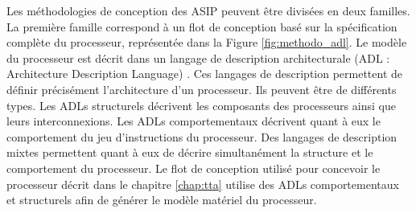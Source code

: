 Les méthodologies de conception des ASIP peuvent être divisées en deux familles. La première famille correspond à un flot de conception basé sur la spécification complète du processeur, représentée dans la Figure \ref{fig:methodo_adl}. Le modèle du processeur est décrit dans un langage de description architecturale (ADL : Architecture Description Language) \cite{mishra2011processor}. Ces langages de description permettent de définir précisément l'architecture d'un processeur. Ils peuvent être de différents types. Les ADLs structurels décrivent les composants des processeurs ainsi que leurs interconnexions. Les ADLs comportementaux décrivent quant à eux le comportement du jeu d'instructions du processeur. Des langages de description mixtes permettent quant à eux de décrire simultanément la structure et le comportement du processeur. Le flot de conception utilisé pour concevoir le processeur décrit dans le chapitre \ref{chap:tta} utilise des ADLs comportementaux et structurels afin de générer le modèle matériel du processeur.


